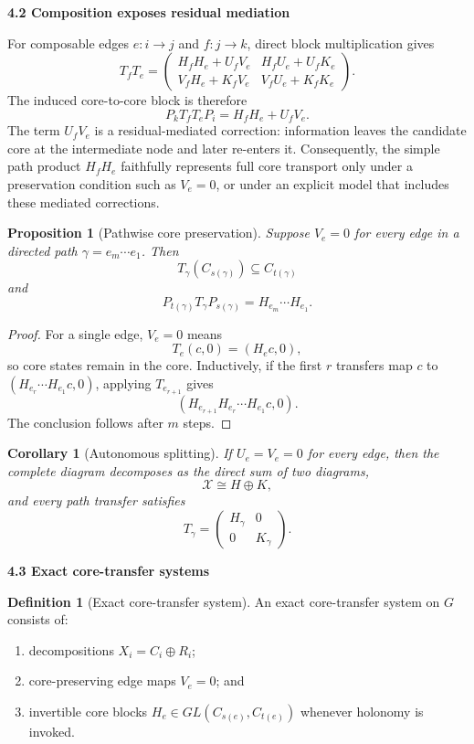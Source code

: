 \documentclass[11pt,letterpaper]{article}
\newcommand{\subtopic}[1]{%
 \vspace{0.45em}
 {\bfseries\color{AccentColor} #1\par}
}
\theoremstyle{plain}
\newtheorem{proposition}[theorem]{Proposition}
\newtheorem{corollary}[theorem]{Corollary}
\theoremstyle{definition}
\newtheorem{definition}[theorem]{Definition}
\begin{document}
\subtopic{4.2 Composition exposes residual mediation}

For composable edges \(e:i\to j\) and \(f:j\to k\), direct block
multiplication gives
\[
T_fT_e
=
\begin{pmatrix}
H_fH_e+U_fV_e & H_fU_e+U_fK_e\\
V_fH_e+K_fV_e & V_fU_e+K_fK_e
\end{pmatrix}.
\]
The induced core-to-core block is therefore
\[
P_kT_fT_eP_i
=
H_fH_e+U_fV_e.
\]
The term \(U_fV_e\) is a residual-mediated correction: information leaves the
candidate core at the intermediate node and later re-enters it. Consequently,
the simple path product \(H_fH_e\) faithfully represents full core transport
only under a preservation condition such as \(V_e=0\), or under an explicit
model that includes these mediated corrections.

\begin{proposition}[Pathwise core preservation]\label{prop:pathwise-preservation}
Suppose \(V_e=0\) for every edge in a directed path
\(\gamma=e_m\cdots e_1\). Then
\[
T_\gamma(C_{s(\gamma)})\subseteq C_{t(\gamma)}
\]
and
\[
P_{t(\gamma)}T_\gamma P_{s(\gamma)}
=
H_{e_m}\cdots H_{e_1}.
\]
\end{proposition}

\begin{proof}
For a single edge, \(V_e=0\) means
\[
T_e(c,0)=(H_ec,0),
\]
so core states remain in the core. Inductively, if the first \(r\) transfers
map \(c\) to \((H_{e_r}\cdots H_{e_1}c,0)\), applying \(T_{e_{r+1}}\) gives
\[
(H_{e_{r+1}}H_{e_r}\cdots H_{e_1}c,0).
\]
The conclusion follows after \(m\) steps.
\end{proof}

\begin{corollary}[Autonomous splitting]\label{cor:autonomous-splitting}
If \(U_e=V_e=0\) for every edge, then the complete diagram decomposes as the
direct sum of two diagrams,
\[
\mathcal X\cong H\oplus K,
\]
and every path transfer satisfies
\[
T_\gamma
=
\begin{pmatrix}
H_\gamma&0\\
0&K_\gamma
\end{pmatrix}.
\]
\end{corollary}

\subtopic{4.3 Exact core-transfer systems}

\begin{definition}[Exact core-transfer system]\label{def:exact-core-transfer}
An exact core-transfer system on \(G\) consists of:
\begin{enumerate}
\item decompositions \(X_i=C_i\oplus R_i\);
\item core-preserving edge maps \(V_e=0\); and
\item invertible core blocks \(H_e\in GL(C_{s(e)},C_{t(e)})\) whenever
holonomy is invoked.
\end{enumerate}
\end{definition}
\end{document}
